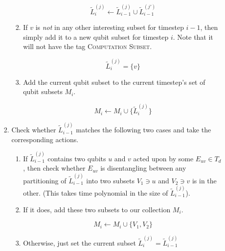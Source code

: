 \begin{enumerate}
\begin{enumerate}
\begin{enumerate}
\begin{enumerate}
\begin{equation*}
\tilde{L}^{(j)}_{i} \leftarrow \tilde{L}^{(j)}_{i-1} \cup \tilde{L}^{(j')}_{i-1}
\end{equation*}

\item
If $v$ is \emph{not} in any other interesting subset for timestep $i-1$,
then simply add it to a new qubit subset for timestep $i$. Note that it will
not have the tag \textsc{Computation Subset}.

\begin{equation*}
\tilde{L}^{(j)}_{i} = \{v\}
\end{equation*}

\item
Add the current qubit subset to the current timestep's set of qubit subsets $M_i$.

\begin{equation*}
M_i \leftarrow M_i \cup \{ \tilde{L}^{(j)}_{i} \}
\end{equation*}

\end{enumerate}

\item Check whether $\tilde{L}^{(j)}_{i-1}$ matches the following two cases
and take the corresponding actions.

\begin{enumerate}
\item If $\tilde{L}^{(j)}_{i-1}$ contains two qubits $u$ and $v$
acted upon by some
$E_{uv} \in T_d$, then check whether $E_{uv}$ is
disentangling between any partitioning of $\tilde{L}^{(j)}_{i-1}$ into two
subsets $V_1 \ni u$ and $V_2 \ni v$ is in the other. (This takes time
polynomial in the size of $\tilde{L}^{(j)}_{i-1}$).

\item
If it does, add these two subsets to our collection $M_i$.

\begin{equation*}
M_i \leftarrow M_i \cup \{ V_1, V_2 \}
\end{equation*}

\item
Otherwise, just set the current subset $\tilde{L}^{(j)}_{i} = \tilde{L}^{(j)}_{i-1}$


\end{enumerate}
\end{enumerate}
\end{enumerate}
\end{enumerate}
